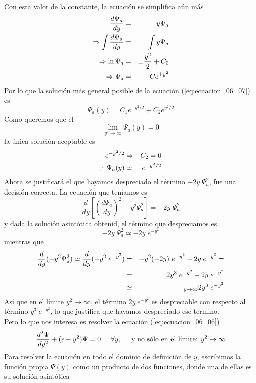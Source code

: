Con esta valor de la constante, la ecuación se simplifica aún más
\begin{eqnarray*}
\dfrac{d \Psi_{a}}{d y} &=& y \Psi_{a} \nonumber \\
\Rightarrow \int \dfrac{d \Psi_{a}}{d y} &=& \int y \Psi_{a} \nonumber \\
\Rightarrow \ln \Psi_{a} &=& \pm \dfrac{y^{2}}{2} + C_{0} \nonumber \\
\Rightarrow \Psi_{a} &=& C e^{\pm y^{2}}
\end{eqnarray*}
Por lo que la solución más general posible de la ecuación (\ref{eq:ecuacion_06_07}) es
\begin{equation}
\Psi_{a} (y) = C_{1} e^{-y^{2}/2} + C_{2} e^{y^{2}/2}
\label{eq:ecuacion_06_08}
\end{equation}
Como queremos que el 
\[ \lim_{y^{2} \to \infty} \Psi_{a} (y) = 0 \]
la única solución aceptable es
\begin{eqnarray}
e^{-y^{2}/2} & \Rightarrow & C_{2} = 0 \nonumber \\
\therefore \Psi_{a} (y) & \simeq & e^{-y^{2}/2}
\label{eq:ecuacion_06_09}
\end{eqnarray}
Ahora se justificará el que hayamos despreciado el término $-2 y \; \Psi^{2}_{a}$, fue una decisión correcta. La ecuación que teníamos es
\[ \dfrac{d}{dy} \left[ \left( \dfrac{d \Psi_{a}}{d y} \right)^{2} - y^{2} \Psi^{2}_{a} \right] = - 2 y \; \Psi^{2}_{a} \]
y dada la solución asintótica obtenid, el término que despreciamos es
\[ -2 y \; \Psi^{2}_{a} \simeq - 2 y \; e^{-y^{2}} \]
mientras que
\begin{eqnarray*}
\dfrac{d}{dy} (- y^{2} \Psi^{2}_{a} ) \simeq \dfrac{d}{dy} (- y^{2} \; e^{-y^{2}}) &=& -y^{2} (-2y) \; e^{-y^{2}} - 2 y\; e^{-y^{2}} = \nonumber \\
&=& 2 y^{3} \; e^{-y^{2}} - 2 y \; e^{-y^{2}}  \nonumber \\
& \simeq & _{y \to \infty} 2 y^{3} \; e^{-y^{2}}
\end{eqnarray*}
Así que en el límite $y^{2} \to \infty$, el término $2 y \; e^{-y^{2}}$ es despreciable con respecto al término $y^{3} \; e^{-y^{2}}$, lo que justifica que hayamos despreciado ese término.
\\
Pero lo que nos interesa es resolver la ecuación (\ref{eq:ecuacion_06_06})
\begin{equation}
\dfrac{d^{2} \Psi}{d y^{2}} + (\epsilon - y^{2}) \Psi = 0 \hspace{0.5cm} \forall y, \hspace{0.5cm} \text{y no sólo en el límite: } y^{2} \to \infty
\label{eq:ecuacion_06_10}
\end{equation}
Para resolver la ecuación en todo el dominio de definición de $y$, escribimos la función propia $\Psi (y)$ como un producto de dos funciones, donde una de ellas es su solución asintótica
